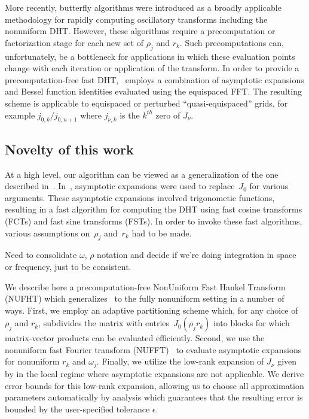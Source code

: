 More recently, butterfly algorithms \cite{oneil2010algorithm, li2015butterfly,
pang2020interpolative} were introduced as a broadly applicable methodology for
rapidly computing oscillatory transforms including the nonuniform DHT. However,
these algorithms require a precomputation or factorization stage for each new
set of $\rho_j$ and $r_k$. Such precomputations can, unfortunately, be a
bottleneck for applications in which these evaluation points change with each
iteration or application of the transform. In order to provide a
precomputation-free fast DHT,~\cite{townsend2015fast} employs a combination of
asymptotic expansions and Bessel function identities evaluated using the
equispaced FFT. The resulting scheme is applicable to equispaced or perturbed
``quasi-equispaced'' grids, for example $j_{0,k} / j_{0,n+1}$ where $j_{\nu,k}$
is the $k^{th}$ zero of $J_\nu$.



\subsection*{Novelty of this work}
\label{sec:novelty}

At a high level, our algorithm can be viewed as a generalization of the one
described in~\cite{townsend2015fast}. In~\cite{townsend2015fast}, asymptotic
expansions were used to replace~$J_0$ for various arguments. These asymptotic
expansions involved trigonometic functions, resulting in a fast algorithm for
computing the DHT using fast cosine transforms (FCTs) and fast sine transforms
(FSTs). In order to invoke these fast algorithms, various assumptions
on~$\rho_j$ and~$r_k$ had to be made.

{\color{red} Need to consolidate $\omega$, $\rho$ notation and decide if we're
doing integration in space or frequency, just to be consistent.}

We describe here a precomputation-free NonUniform Fast Hankel Transform (NUFHT)
which generalizes~\cite{townsend2015fast} to the fully nonuniform setting in a
number of ways. First, we employ an adaptive partitioning scheme which, for any
choice of $\rho_j$ and $r_k$, subdivides the matrix with entries~$J_0(\rho_j r_k)$ into blocks for which
matrix-vector products can be evaluated efficiently. Second, we use the
nonuniform fast Fourier transform (NUFFT)~\cite{dutt1993fast,
greengard2004accelerating} to evaluate asymptotic expansions for nonuniform
$r_k$ and $\omega_j$. Finally, we utilize the low-rank expansion of $J_\nu$
given by \cite{wimp1962polynomial} in the local regime where asymptotic
expansions are not applicable. We derive error bounds for this low-rank
expansion, allowing us to choose all approximation parameters automatically by
analysis which guarantees that the resulting error is bounded by the
user-specified tolerance $\epsilon$.

